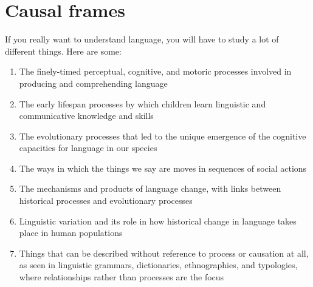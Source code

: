 \chapter{Causal frames}
\label{causaldynamics}



If you really want to understand language, you will have to study a lot of different things. Here are some:

\begin{enumerate}
\item[\textbullet] {The finely-timed perceptual, cognitive, and motoric processes involved in producing and comprehending language}
\item[\textbullet] {The early lifespan processes by which children learn linguistic and communicative knowledge and skills}
\item[\textbullet] {The evolutionary processes that led to the unique emergence of the cognitive capacities for language in our species}
\item[\textbullet] {The ways in which the things we say are moves in sequences of social actions}
\item[\textbullet] {The mechanisms and products of language change, with links between historical processes and evolutionary processes}
\item[\textbullet] {Linguistic variation and its role in how historical change in language takes place in human populations}
\item[\textbullet] {Things that can be described without reference to process or causation at all, as seen in linguistic grammars, dictionaries, ethnographies, and typologies, where relationships rather than processes are the focus}
\end{enumerate}

